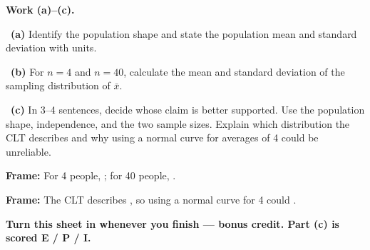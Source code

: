 \documentclass[11pt]{article}
\begin{document}
\newpage
\textbf{Work (a)--(c).}\par\smallskip

~\textbf{(a)} Identify the population shape and state the population mean and standard deviation with units.\par
\workspace{0.7in}

~\textbf{(b)} For $n=4$ and $n=40$, calculate the mean and standard deviation of the sampling distribution of $\bar{x}$.\par
\workspace{1.4in}

~\textbf{(c)} In 3--4 sentences, decide whose claim is better supported. Use the population shape, independence, and the two sample sizes. Explain which distribution the CLT describes and why using a normal curve for averages of 4 could be unreliable.\par
\workspace{2.0in}

\begin{sentenceframebox}\raggedright\textbf{Frame:} For 4 people, \blank[2.5in]; for 40 people, \blank[2.5in].\end{sentenceframebox}

\begin{sentenceframebox}\raggedright\textbf{Frame:} The CLT describes \blank[2.2in], so using a normal curve for 4 could \blank[2.2in].\end{sentenceframebox}

\textbf{Turn this sheet in whenever you finish --- bonus credit. Part (c) is scored E / P / I.}\par
\end{document}
